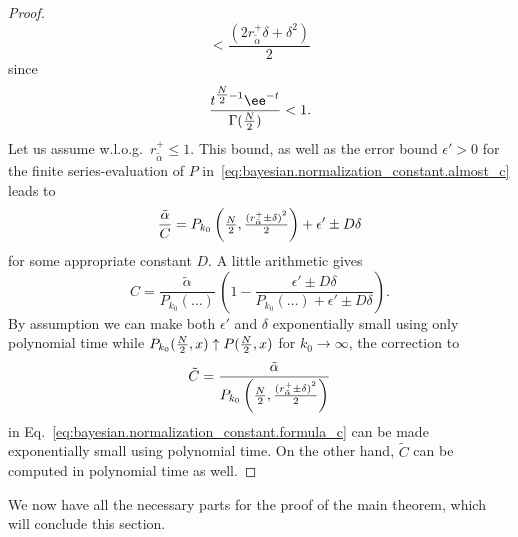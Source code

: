 \begin{proof}
\begin{equation}
    < \frac{\left( 2 {r^+_{\tilde\alpha}} \delta + \delta^2 \right)}{2}
  \end{equation}
  since
  \begin{equation}
    \frac{t^{\Nhalf - 1} \ee^{-t}}{\Gamma(\Nhalf)} < 1.
  \end{equation}
  Let us assume w.l.o.g.\ $r^+_{\tilde\alpha} \le 1$.
  This bound, as well as the error bound $\epsilon' > 0$ for the finite series-evaluation of $P$ in~\eqref{eq:bayesian.normalization_constant.almost_c} leads to
  \begin{equation}
    \frac{\tilde\alpha}{C} = P_{k_0}\left( \tfrac{N}{2}, \tfrac{{(r^+_{\tilde\alpha} \pm \delta)}^2}{2} \right) + \epsilon' \pm D \delta
  \end{equation}
  for some appropriate constant $D$.
  A little arithmetic gives
  \begin{equation}
    \label{eq:bayesian.normalization_constant.formula_c}
    C = \frac{\tilde\alpha}{P_{k_0}(\ldots)} \, \left( 1 - \frac{\epsilon' \pm D\delta}{P_{k_0}(\ldots) + \epsilon' \pm D\delta} \right).
  \end{equation}
  By assumption we can make both $\epsilon'$ and $\delta$ exponentially small using only polynomial time while $P_{k_0}(\tfrac{N}{2}, x) \uparrow P(\tfrac{N}{2},x)$ for $k_0 \to \infty$, the correction to
  \begin{equation}
    \tilde C = \frac{\tilde\alpha}{P_{k_0}\left( \tfrac{N}{2}, \tfrac{{(r^+_{\tilde\alpha} \pm \delta)}^2}{2} \right)}
  \end{equation}
  in Eq.~\eqref{eq:bayesian.normalization_constant.formula_c} can be made exponentially small using polynomial time.
  On the other hand, $\tilde C$ can be computed in polynomial time as well.
\end{proof}

We now have all the necessary parts for the proof of the main theorem, which will conclude this section.

